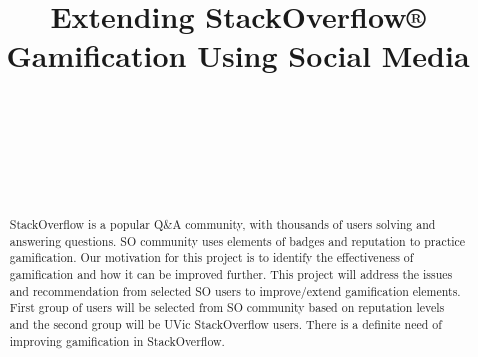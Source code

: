\documentclass{sigchi}
\begin{document}
\title{Extending StackOverflow® Gamification Using Social Media}

\author{%
    \\
    \\
    \\
    \\
    \\
}

\maketitle

\begin{abstract}
StackOverflow is a popular Q\&A community, with thousands of users solving and
answering questions. SO community uses elements of badges and reputation to
practice gamification. Our motivation for this project is to identify the
effectiveness of gamification and how it can be improved further. This project
will address the issues and recommendation from selected SO users to
improve/extend gamification elements. First group of users will be selected
from SO community based on reputation levels and the second group will be UVic
StackOverflow users. There is a definite need of improving gamification in
StackOverflow.
\end{abstract}
\end{document}
